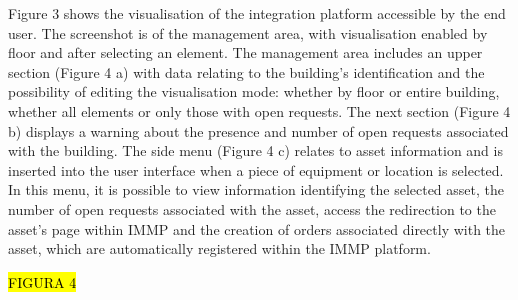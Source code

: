Figure 3 shows the visualisation of the integration platform accessible by the end user. The screenshot is of the management area, with visualisation enabled by floor and after selecting an element. The management area includes an upper section (Figure 4 a) with data relating to the building's identification and the possibility of editing the visualisation mode: whether by floor or entire building, whether all elements or only those with open requests. The next section (Figure 4 b) displays a warning about the presence and number of open requests associated with the building. The side menu (Figure 4 c) relates to asset information and is inserted into the user interface when a piece of equipment or location is selected. In this menu, it is possible to view information identifying the selected asset, the number of open requests associated with the asset, access the redirection to the asset's page within IMMP and the creation of orders associated directly with the asset, which are automatically registered within the IMMP platform.

\hl{FIGURA 4}





   